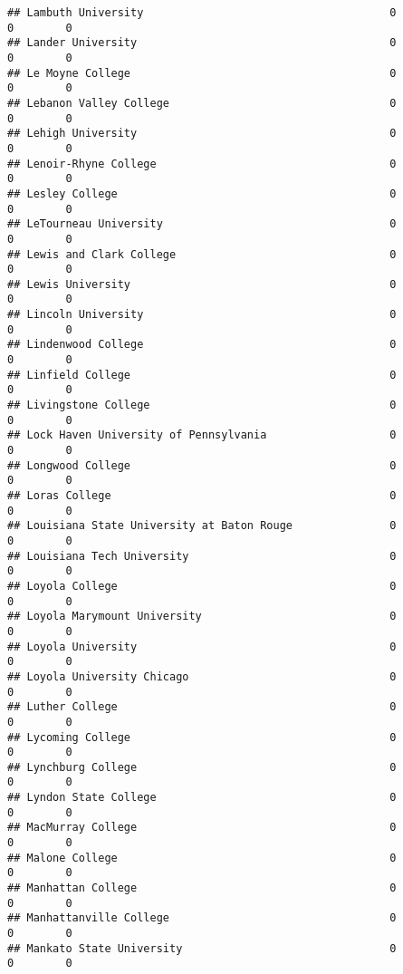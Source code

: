 \documentclass[
]{article}
\begin{document}
\begin{verbatim}
## Lambuth University                                      0           0        0
## Lander University                                       0           0        0
## Le Moyne College                                        0           0        0
## Lebanon Valley College                                  0           0        0
## Lehigh University                                       0           0        0
## Lenoir-Rhyne College                                    0           0        0
## Lesley College                                          0           0        0
## LeTourneau University                                   0           0        0
## Lewis and Clark College                                 0           0        0
## Lewis University                                        0           0        0
## Lincoln University                                      0           0        0
## Lindenwood College                                      0           0        0
## Linfield College                                        0           0        0
## Livingstone College                                     0           0        0
## Lock Haven University of Pennsylvania                   0           0        0
## Longwood College                                        0           0        0
## Loras College                                           0           0        0
## Louisiana State University at Baton Rouge               0           0        0
## Louisiana Tech University                               0           0        0
## Loyola College                                          0           0        0
## Loyola Marymount University                             0           0        0
## Loyola University                                       0           0        0
## Loyola University Chicago                               0           0        0
## Luther College                                          0           0        0
## Lycoming College                                        0           0        0
## Lynchburg College                                       0           0        0
## Lyndon State College                                    0           0        0
## MacMurray College                                       0           0        0
## Malone College                                          0           0        0
## Manhattan College                                       0           0        0
## Manhattanville College                                  0           0        0
## Mankato State University                                0           0        0

\end{verbatim}
\end{document}
